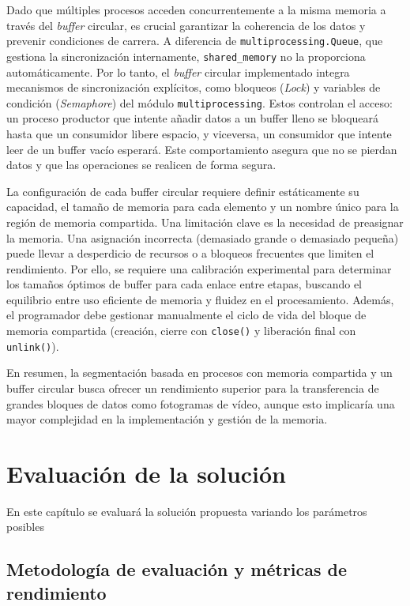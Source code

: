 \documentclass[11pt,spanish,listoffigures,listoftables]{tfgetsinf}
\begin{document}
Dado que múltiples procesos acceden concurrentemente a la misma memoria a través del \textit{buffer} circular, es crucial garantizar la coherencia de los datos y prevenir condiciones de carrera. A diferencia de \texttt{multiprocessing.Queue}, que gestiona la sincronización internamente, \texttt{shared\_memory} no la proporciona automáticamente. Por lo tanto, el \textit{buffer} circular implementado integra mecanismos de sincronización explícitos, como bloqueos (\textit{Lock}) y variables de condición (\textit{Semaphore}) del módulo \texttt{multiprocessing}. Estos controlan el acceso: un proceso productor que intente añadir datos a un buffer lleno se bloqueará hasta que un consumidor libere espacio, y viceversa, un consumidor que intente leer de un buffer vacío esperará. Este comportamiento asegura que no se pierdan datos y que las operaciones se realicen de forma segura.

La configuración de cada buffer circular requiere definir estáticamente su capacidad, el tamaño de memoria para cada elemento y un nombre único para la región de memoria compartida. Una limitación clave es la necesidad de preasignar la memoria. Una asignación incorrecta (demasiado grande o demasiado pequeña) puede llevar a desperdicio de recursos o a bloqueos frecuentes que limiten el rendimiento. Por ello, se requiere una calibración experimental para determinar los tamaños óptimos de buffer para cada enlace entre etapas, buscando el equilibrio entre uso eficiente de memoria y fluidez en el procesamiento. Además, el programador debe gestionar manualmente el ciclo de vida del bloque de memoria compartida (creación, cierre con \texttt{close()} y liberación final con \texttt{unlink()}).

En resumen, la segmentación basada en procesos con memoria compartida y un buffer circular busca ofrecer un rendimiento superior para la transferencia de grandes bloques de datos como fotogramas de vídeo, aunque esto implicaría una mayor complejidad en la implementación y gestión de la memoria.


\chapter{Evaluación de la solución} \label{ch:evaluacion_solucion}

En este capítulo se evaluará la solución propuesta variando los parámetros posibles

\section{Metodología de evaluación y métricas de rendimiento} \label{sec:metodologia}
\end{document}
